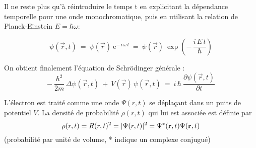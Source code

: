 \documentclass[openany]{book}
\begin{document}
Il ne reste plus qu'\`a r\'eintroduire le temps t en explicitant la d\'ependance temporelle pour une onde monochromatique, puis en utilisant la relation de Planck-Einstein $E = \hbar \omega$:

$$
\psi(\vec{r},t) \ = \ \psi(\vec{r}) \ \mathrm{e}^{- \, i \, \omega \, t} \ = \ \psi(\vec{r}) \ \exp \left( - \, \frac{i \, E \, t}{\hbar} \right)
$$

On obtient finalement l'\'equation de Schr\"odinger g\'en\'erale :
$$
- \ \frac{\hbar^2}{2m} \, \Delta \psi(\vec{r},t) \ + \ V(\vec{r}) \, \psi(\vec{r},t) \ = \ i \, \hbar \ \frac{\partial \psi(\vec{r},t)}{\partial t}
$$


L'\'electron est trait\'e comme une onde $\Psi(r,t)$ se d\'epla\c cant dans un puits de potentiel $V$.
La densit\'e de probabilit\'e $\rho(r,t)$ qui lui est associ\'ee est d\'efinie par
$$
\rho(r,t)= R(r,t)^2 = |\Psi(r,t)|^2=\Psi^*(\bold{r},t)\Psi(\bold{r},t)\,\!
$$
(probabilit\'e par unit\'e de volume, * indique un complexe conjugu\'e)
\end{document}
